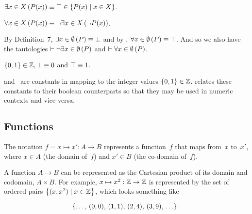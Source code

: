 \indexsym{}
\begin{definition}
  $\Exists{x\in X}{P(x)} \equiv
    \true \in \Set{P(x) \mid x\in X}$.
\end{definition}

\indexsym{}
\begin{definition}
  $\Forall{x\in X}{P(x)} \equiv \neg\Exists{x\in X}{\neg P(x)}$.
\end{definition}

\indexsym{}
\begin{remark}
  By Definition~7, $\Exists{x\in\emptyset}P \equiv \false$
    and by , $\Forall{x\in\emptyset}P \equiv \true$.
  And so we also have the tautologies $\infer \neg\Exists{x\in\emptyset}P$
    and $\infer \Forall{x\in\emptyset}P$.
\end{remark}

\begin{definition}
  $\left\{0,1\right\}\in\mathbb{Z}, \bot \equiv 0$ and $\top \equiv 1$.
\end{definition}

\tamefalse{} and~\tametrue{} are constants in \tame{} mapping to the
  integer values $\{0,1\}\in\mathbb{Z}$.
 relates these constants to their
  boolean counterparts so that they may be used in numeric contexts
  and vice-versa.


\subsection{Functions}
The notation $f = x \mapsto x' : A\rightarrow B$ represents a function~$f$
  that maps from~$x$ to~$x'$,
    where $x\in A$ (the domain of~$f$) and $x'\in B$ (the co-domain of~$f$).

A function $A\rightarrow B$ can be represented as the Cartesian
  product of its domain and codomain, $A\times B$.
For example,
  $x\mapsto x^2 : \mathbb{Z}\rightarrow\mathbb{Z}$ is represented by the set of ordered
  pairs $\left\{(x,x^2) \mid x\in\mathbb{Z}\right\}$, which looks something like

\begin{equation*}
  \left\{\ldots,\,(0,0),\,(1,1),\,(2,4),\,(3,9),\,\ldots\right\}.
\end{equation*}

